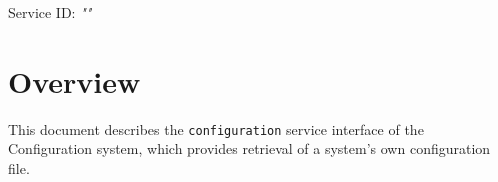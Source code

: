 \documentclass[a4paper]{arrowhead}
\begin{document}
\sloppy

\ArrowheadSetup

\begin{center}
  \vspace*{1cm}
  \huge{\arrowtitle}

  \vspace*{0.2cm}
  \LARGE{\arrowtype}
  \vspace*{1cm}

  \Large{Service ID: \textit{"\arrowid"}}

  \vspace*{\fill}


  \vspace*{1cm}
  \vspace*{\fill}

  \begin{abstract}
    This document describes the HTTP/1.1 protocol with TLS payload security and JSON payload encoding variant of the \texttt{configuration} service of the Configuration system.
  \end{abstract}

  \vspace*{1cm}
\end{center}

\newpage

\tableofcontents
\newpage

\section{Overview}
\label{sec:overview}

This document describes the \texttt{configuration} service interface of the Configuration system, which provides retrieval of a system's own configuration file.
\end{document}
